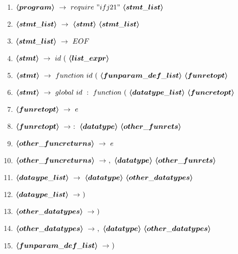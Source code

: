     \begin{enumerate}
	\item $\mbox{\boldmath$\langle{}program\rangle{}$}\ \rightarrow\ require\ "ifj21"\ \mbox{\boldmath$\langle{}stmt\_list\rangle{}$}$
	\item $\mbox{\boldmath$\langle{}stmt\_list\rangle{}$}\ \rightarrow\ \mbox{\boldmath$\langle{}stmt\rangle{}$}\ \mbox{\boldmath$\langle{}stmt\_list\rangle{}$}$
	\item $\mbox{\boldmath$\langle{}stmt\_list\rangle{}$}\ \rightarrow\ EOF$
	\item $\mbox{\boldmath$\langle{}stmt\rangle{}$}\ \rightarrow\ id\ (\ \mbox{\boldmath$\langle{}list\_expr\rangle{}$}$
	\item $\mbox{\boldmath$\langle{}stmt\rangle{}$}\ \rightarrow\ function\ id\ (\ \mbox{\boldmath$\langle{}funparam\_def\_list\rangle{}$}\ \mbox{\boldmath$\langle{}funretopt\rangle{}$}$
	\item $\mbox{\boldmath$\langle{}stmt\rangle{}$}\ \rightarrow\ global\ id\ :\ function\ (\ \mbox{\boldmath$\langle{}datatype\_list\rangle{}$}\ \mbox{\boldmath$\langle{}funcretopt\rangle{}$}$
	\item $\mbox{\boldmath$\langle{}funretopt\rangle{}$}\ \rightarrow\ e$
	\item $\mbox{\boldmath$\langle{}funretopt\rangle{}$}\ \rightarrow\ :\ \mbox{\boldmath$\langle{}datatype\rangle{}$}\ \mbox{\boldmath$\langle{}other\_funrets\rangle{}$}$
	\item $\mbox{\boldmath$\langle{}other\_funcreturns\rangle{}$}\ \rightarrow\ e$
	\item $\mbox{\boldmath$\langle{}other\_funcreturns\rangle{}$}\ \rightarrow\ ,\ \mbox{\boldmath$\langle{}datatype\rangle{}$}\ \mbox{\boldmath$\langle{}other\_funrets\rangle{}$}$
	\item $\mbox{\boldmath$\langle{}dataype\_list\rangle{}$}\ \rightarrow\ \mbox{\boldmath$\langle{}datatype\rangle{}$}\ \mbox{\boldmath$\langle{}other\_datatypes\rangle{}$}$
	\item $\mbox{\boldmath$\langle{}dataype\_list\rangle{}$}\ \rightarrow\ )$
	\item $\mbox{\boldmath$\langle{}other\_datatypes\rangle{}$}\ \rightarrow\ )$
	\item $\mbox{\boldmath$\langle{}other\_datatypes\rangle{}$}\ \rightarrow\ ,\ \mbox{\boldmath$\langle{}datatype\rangle{}$}\ \mbox{\boldmath$\langle{}other\_datatypes\rangle{}$}$
	\item $\mbox{\boldmath$\langle{}funparam\_def\_list\rangle{}$}\ \rightarrow\ )$

\end{enumerate}
